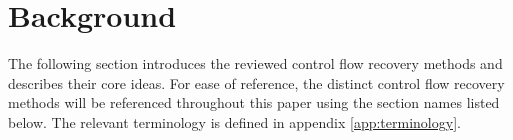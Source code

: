 
\section{Background}

The following section introduces the reviewed control flow recovery methods and describes their core ideas. For ease of reference, the distinct control flow recovery methods will be referenced throughout this paper using the section names listed below. The relevant terminology is defined in appendix \ref{app:terminology}.





%
